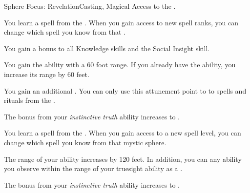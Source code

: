     \begin{feat}{Sphere Focus: Revelation}{Casting, Magical}
        \featpre Access to the  .

         You learn a spell from the  .
        When you gain access to new spell ranks, you can change which spell you know from that .

         You gain a  bonus to all Knowledge skills and the Social Insight skill.

         You gain the  ability with a 60 foot range.
        If you already have the  ability, you increase its range by 60 feet.

         You gain an additional .
        You can only use this attunement point to  to spells and rituals from the  .

         The bonus from your \textit{instinctive truth} ability increases to .

         You learn a spell from the  .
        When you gain access to a new spell level, you can change which spell you know from that mystic sphere.

         The range of your  ability increases by 120 feet.
        In addition, you can  any  ability you observe within the range of your truesight ability as a .

         The bonus from your \textit{instinctive truth} ability increases to .
    \end{feat}

